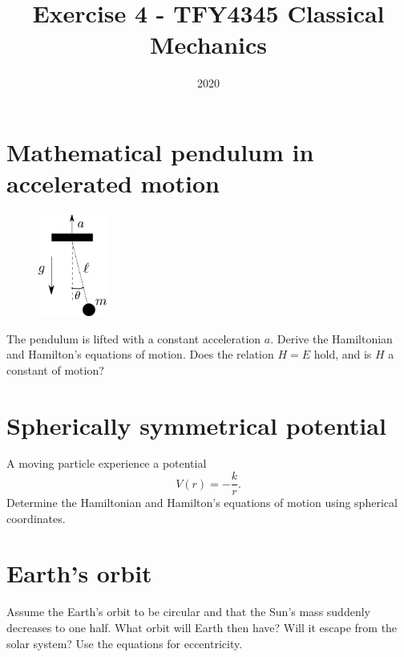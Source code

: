 \documentclass{article}
\title{Exercise 4 - TFY4345 Classical Mechanics}
\date{2020}
\begin{document}
    \maketitle
    \section{Mathematical pendulum in accelerated motion} 
        \begin{figure}
            \vspace{-1cm}
            \includegraphics[width=0.2\textwidth]{figures/figure_1.pdf}
            \vspace{-2cm}
        \end{figure}
        The pendulum is lifted with a constant acceleration $a$. Derive the Hamiltonian and Hamilton's equations of motion. Does the relation $H = E$ hold, and is $H$ a constant of motion?

    \section{Spherically symmetrical potential}
        A moving particle experience a potential 
        \begin{equation*}
            V(r) = -\frac{k}{r}.
        \end{equation*}
        Determine the Hamiltonian and Hamilton's equations of motion using spherical coordinates.

    \section{Earth's orbit}
        Assume the Earth's orbit to be circular and that the Sun's mass suddenly decreases to one half. What orbit will Earth then have? Will it escape from the solar system? Use the equations for eccentricity.
\end{document}
